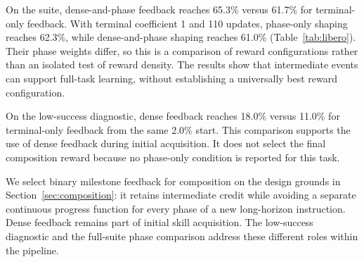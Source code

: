 On the suite, dense-and-phase feedback reaches 65.3\% versus 61.7\% for terminal-only feedback. With terminal coefficient 1 and 110 updates, phase-only shaping reaches 62.3\%, while dense-and-phase shaping reaches 61.0\% (Table~\ref{tab:libero}). Their phase weights differ, so this is a comparison of reward configurations rather than an isolated test of reward density. The results show that intermediate events can support full-task learning, without establishing a universally best reward configuration.

On the low-success diagnostic, dense feedback reaches 18.0\% versus 11.0\% for terminal-only feedback from the same 2.0\% start. This comparison supports the use of dense feedback during initial acquisition. It does not select the final composition reward because no phase-only condition is reported for this task.

We select binary milestone feedback for composition on the design grounds in Section~\ref{sec:composition}: it retains intermediate credit while avoiding a separate continuous progress function for every phase of a new long-horizon instruction. Dense feedback remains part of initial skill acquisition. The low-success diagnostic and the full-suite phase comparison address these different roles within the pipeline.

